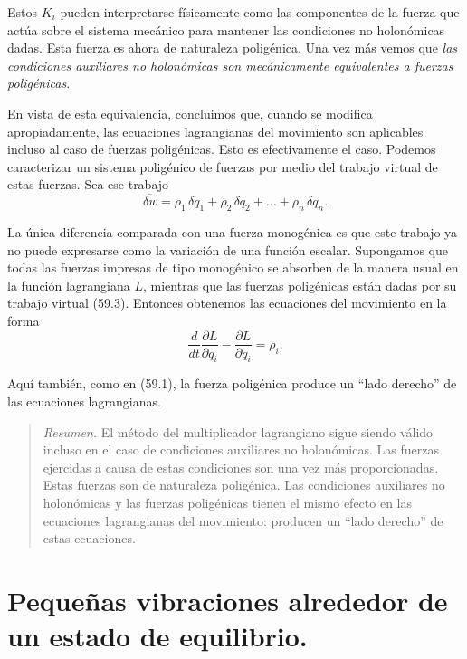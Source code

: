 \documentclass[12pt,a4paper]{book}
\begin{document}
Estos $K_i$ pueden interpretarse físicamente como las componentes de la fuerza que actúa sobre el sistema mecánico para mantener las condiciones no holonómicas dadas. Esta fuerza es ahora de naturaleza poligénica. Una vez más vemos que \textit{las condiciones auxiliares no holonómicas son mecánicamente equivalentes a fuerzas poligénicas}.

En vista de esta equivalencia, concluimos que, cuando se modifica apropiadamente, las ecuaciones lagrangianas del movimiento son aplicables incluso al caso de fuerzas poligénicas. Esto es efectivamente el caso. Podemos caracterizar un sistema poligénico de fuerzas por medio del trabajo virtual de estas fuerzas. Sea ese trabajo
\begin{equation}
\overline{\delta w} = \rho_1\,\delta q_1 + \rho_2\,\delta q_2 + \ldots + \rho_n\,\delta q_n. \tag{59.3}
\end{equation}

La única diferencia comparada con una fuerza monogénica es que este trabajo ya no puede expresarse como la variación de una función escalar. Supongamos que todas las fuerzas impresas de tipo monogénico se absorben de la manera usual en la función lagrangiana $L$, mientras que las fuerzas poligénicas están dadas por su trabajo virtual (59.3). Entonces obtenemos las ecuaciones del movimiento en la forma
\begin{equation}
\frac{d}{dt}\frac{\partial L}{\partial \dot{q}_i} - \frac{\partial L}{\partial q_i} = \rho_i. \tag{59.4}
\end{equation}


Aquí también, como en (59.1), la fuerza poligénica produce un ``lado derecho'' de las ecuaciones lagrangianas.

\begin{quote}
\textit{Resumen.} El método del multiplicador lagrangiano sigue siendo válido incluso en el caso de condiciones auxiliares no holonómicas. Las fuerzas ejercidas a causa de estas condiciones son una vez más proporcionadas. Estas fuerzas son de naturaleza poligénica. Las condiciones auxiliares no holonómicas y las fuerzas poligénicas tienen el mismo efecto en las ecuaciones lagrangianas del movimiento: producen un ``lado derecho'' de estas ecuaciones.
\end{quote}

\section{Pequeñas vibraciones alrededor de un estado de equilibrio.}
\end{document}
